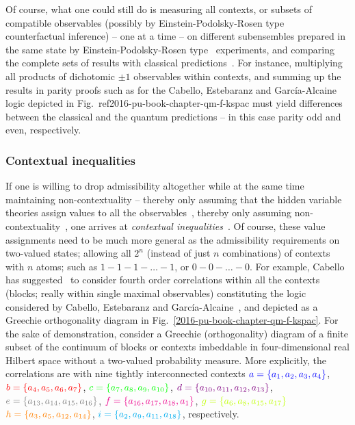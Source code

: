 \documentclass[%
  twocolumn,
 showpacs,
 showkeys,
 preprintnumbers,
 amsmath,amssymb,
 aps,
  pra,
  longbibliography,
 floatfix,
 ]{revtex4-1}
\begin{document}
Of course, what one could still do is measuring all contexts, or subsets of compatible observables
(possibly by Einstein-Podolsky-Rosen type~\cite{epr} counterfactual inference) -- one at a time --
 on different subensembles
prepared in the same state by Einstein-Podolsky-Rosen type~\cite{epr} experiments,
and comparing the complete sets of results
with classical predictions~\cite{ghz}.
For instance, multiplying all products  of dichotomic $\pm 1$ observables within contexts,
and summing up the results in
parity proofs such as for the Cabello, Estebaranz and Garc{\'{i}}a-Alcaine logic
depicted in Fig.~ref{2016-pu-book-chapter-qm-f-kspac}
must yield differences between the classical and the quantum predictions --
in this case parity odd and even, respectively.

\subsubsection{Contextual inequalities}

If one is willing to drop admissibility altogether while at the same time maintaining non-contextuality -- thereby only assuming
that the hidden variable theories assign
values to all the observables~\cite[Sect.~4, p.~375]{Bengtsson-2012},
thereby  only assuming non-contextuality~\cite{cabello:210401},
one arrives at {\em contextual inequalities}~\cite{cabello-2013-ncyclea}.
Of course, these value assignments need to be much more general as the admissibility requirements on
two-valued states; allowing all $2^n$ (instead of just $n$ combinations) of contexts with $n$ atoms;
such as $1-1-1- \ldots -1$, or $0-0-\ldots -0$.
For example, Cabello has suggested~\cite{cabello:210401} to consider fourth order correlations within all the contexts
(blocks; really within single maximal observables)
constituting the logic considered by
Cabello, Estebaranz and Garc{\'{i}}a-Alcaine~\cite{cabello-96,cabello-99},
and depicted as a Greechie orthogonality diagram in Fig.~\ref{2016-pu-book-chapter-qm-f-kspac}.
For the sake of demonstration, consider a Greechie (orthogonality) diagram of a
finite subset of the continuum of blocks or contexts imbeddable in
four-dimensional real Hilbert space without a two-valued probability measure.
More explicitly, the correlations are with  nine tightly interconnected contexts
$\color{blue}a=\{a_1,a_2,a_3,a_4\}$,
$\color{red}b=\{a_4,a_5,a_6,a_7\}$,
$\color{green}c=\{a_7,a_8,a_9,a_{10}\}$,
$\color{violet}d=\{a_{10},a_{11},a_{12},a_{13}\}$,
$\color{gray}e=\{a_{13},a_{14},a_{15},a_{16}\}$,
$\color{magenta}f=\{a_{16},a_{17},a_{18},a_1\}$,
$\color{lime}g=\{a_6,a_8,a_{15},a_{17}\}$
$\color{orange}h=\{a_3,a_5,a_{12},a_{14}\}$,
$\color{cyan}i=\{a_2,a_9,a_{11},a_{18}\}$, respectively.
\end{document}
